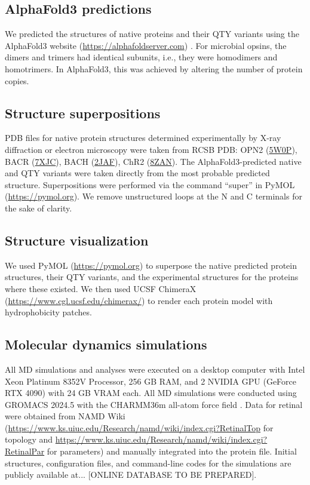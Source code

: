 \documentclass[fleqn,10pt,lineno]{manuscript}
\begin{document}
\subsection*{AlphaFold3 predictions}

We predicted the structures of native proteins and their QTY variants using the AlphaFold3 website (\url{https://alphafoldserver.com}) \citep{Abramson_2024}. For microbial opsins, the dimers and trimers had identical subunits, i.e., they were homodimers and homotrimers. In AlphaFold3, this was achieved by altering the number of protein copies. 

\subsection*{Structure superpositions}

PDB files for native protein structures determined experimentally by X-ray diffraction or electron microscopy were taken from RCSB PDB: OPN2 (\href{https://www.rcsb.org/structure/5W0P}{5W0P}), BACR (\href{https://www.rcsb.org/structure/7XJC}{7XJC}), BACH (\href{https://www.rcsb.org/structure/2JAF}{2JAF}), ChR2 (\href{https://www.rcsb.org/structure/8ZAN}{8ZAN}). The AlphaFold3-predicted native and QTY variants were taken directly from the most probable predicted structure. Superpositions were performed via the command ``super'' in PyMOL (\url{https://pymol.org}). We remove unstructured loops at the N and C terminals for the sake of clarity. 

\subsection*{Structure visualization}

We used PyMOL (\url{https://pymol.org}) to superpose the native predicted protein structures, their QTY variants, and the experimental structures for the proteins where these existed. We then used UCSF ChimeraX (\url{https://www.cgl.ucsf.edu/chimerax/}) to render each protein model with hydrophobicity patches.  

\subsection*{Molecular dynamics simulations}

All MD simulations and analyses were executed on a desktop computer with Intel Xeon Platinum 8352V Processor, 256 GB RAM, and 2 NVIDIA GPU (GeForce RTX 4090) with 24 GB VRAM each. All MD simulations were conducted using GROMACS 2024.5 \citep{Abraham_2015} with the CHARMM36m all-atom force field \citep{Huang_2017}. Data for retinal were obtained from NAMD Wiki (\url{https://www.ks.uiuc.edu/Research/namd/wiki/index.cgi?RetinalTop} for topology and \url{https://www.ks.uiuc.edu/Research/namd/wiki/index.cgi?RetinalPar} for parameters) and manually integrated into the protein file. Initial structures, configuration files, and command-line codes for the simulations are publicly available at... [ONLINE DATABASE TO BE PREPARED]. 
\end{document}
